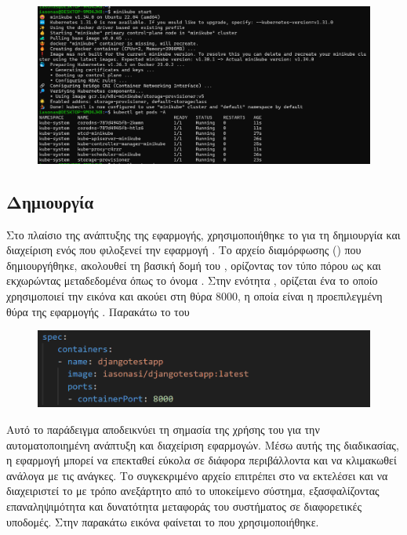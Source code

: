\begin{figure}[h]
	\centering
	\includegraphics[width=1.5\textwidth]{graphics/minikube_deployment_k8s.png}
	\caption{}
\end{figure}

\subsection{Δημιουργία }

Στο πλαίσιο της ανάπτυξης της εφαρμογής, χρησιμοποιήθηκε το 
 για τη δημιουργία και διαχείριση ενός  
που φιλοξενεί την εφαρμογή . Το αρχείο διαμόρφωσης 
() που δημιουργήθηκε, ακολουθεί τη βασική δομή του , 
ορίζοντας τον τύπο πόρου ως  και 
εκχωρώντας μεταδεδομένα όπως το όνομα . 
Στην ενότητα , ορίζεται ένα  
το οποίο χρησιμοποιεί την εικόνα  
και ακούει στη θύρα 8000, η οποία είναι η προεπιλεγμένη θύρα της 
εφαρμογής . Παρακάτω το  του 

\FloatBarrier

\begin{figure}[h]
	\centering
	\includegraphics[width=1.5\textwidth]{graphics/pod_spec.png}
	\caption{}
\end{figure}

\FloatBarrier

Αυτό το παράδειγμα αποδεικνύει τη σημασία της χρήσης του  
για την αυτοματοποιημένη ανάπτυξη και διαχείριση  
εφαρμογών. Μέσω αυτής της διαδικασίας, η εφαρμογή μπορεί να 
επεκταθεί εύκολα σε διάφορα περιβάλλοντα και να κλιμακωθεί 
ανάλογα με τις ανάγκες. Το συγκεκριμένο αρχείο  
επιτρέπει στο  να εκτελέσει και να διαχειριστεί το 
 με τρόπο ανεξάρτητο από το υποκείμενο σύστημα, 
εξασφαλίζοντας επαναληψιμότητα και δυνατότητα μεταφοράς του 
συστήματος σε διαφορετικές υποδομές. Στην παρακάτω εικόνα φαίνεται το 
 που χρησιμοποιήθηκε. 

